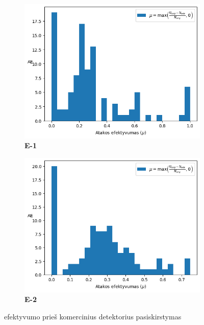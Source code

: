 \begin{figure}[h]
    \begin{small}
        \begin{center}
            \begin{subfigure}[t]{0.48\textwidth}
                \centering
                \caption{\textbf{E-1}}
                \includegraphics[width=\textwidth]{img/mu_distribution_paper.png}
            \end{subfigure}
            \hfill
            \begin{subfigure}[t]{0.48\textwidth}
                \centering
                \caption{\textbf{E-2}}
                \includegraphics[width=\textwidth]{img/mu_distribution.png}
            \end{subfigure}
        \end{center}
        \caption{ efektyvumo prieš komercinius detektorius pasiskirstymas}\label{fig:experiment:mu_dist}
    \end{small}
\end{figure}

